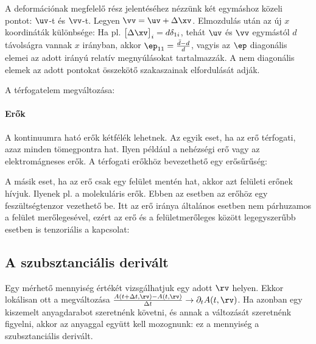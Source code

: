    A deformációnak megfelelő rész jelentéséhez nézzünk két egymáshoz közeli pontot: $\uv$-t és $\vv$-t.
   Legyen $\vv=\uv+\Delta \xv$.
   Elmozdulás után az új $x$ koordináták különbsége: 
   Ha pl. $\big[\Delta\xv\big]_i=d\delta_{1i}$, tehát $\uv$ és $\vv$ egymástól $d$ távolságra vannak $x$ irányban, akkor $\ep_{11}=\frac{\bar d-d}{d}$, vagyis az $\ep$ diagonális elemei az adott irányú relatív megnyúlásokat tartalmazzák.
   A nem diagonális elemek az adott pontokat összekötő szakaszainak elfordulását adják. 
   
   A térfogatelem megváltozása: 
   
   \paragraph{Erők} 
   
    A kontinuumra ható erők kétfélék lehetnek.
   Az egyik eset, ha az erő térfogati, azaz minden tömegpontra hat.
   Ilyen például a nehézségi erő vagy az elektromágneses erők.
   A térfogati erőkhöz bevezethető egy erősűrűség: 
    
    A másik eset, ha az erő csak egy felület mentén hat, akkor azt felületi erőnek hívjuk.
   Ilyenek pl. a molekuláris erők.
   Ebben az esetben az erőhöz egy feszültségtenzor vezethető be.
   Itt az erő iránya általános esetben nem párhuzamos a felület merőlegesével, ezért az erő és a felületmerőleges között legegyszerűbb esetben is tenzoriális a kapcsolat:
    
  \subsection{A szubsztanciális derivált}
   
   Egy mérhető mennyiség értékét vizsgálhatjuk egy adott $\rv$ helyen.
   Ekkor lokálisan ott a megváltozása $\frac{A(t+\Delta t,\rv)-A(t,\rv)}{\Delta t}\to\partial_t A(t,\rv)$.
   Ha azonban egy kiszemelt anyagdarabot szeretnénk követni, és annak a változását szeretnénk figyelni, akkor az anyaggal együtt kell mozognunk:
   ez a mennyiség a szubsztanciális derivált. 
   
